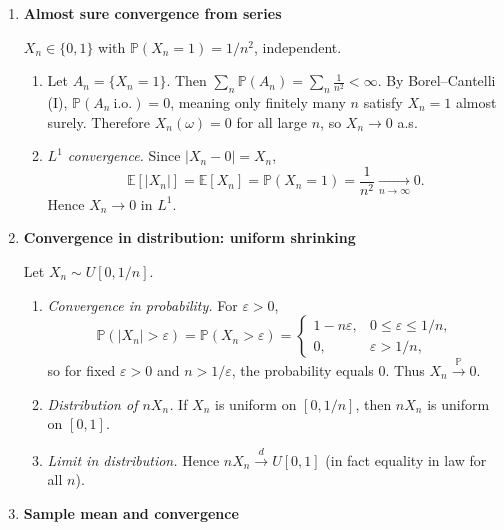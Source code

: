 \documentclass[11pt]{article}
\begin{document}
\begin{enumerate}
\bigskip

\item \textbf{Almost sure convergence from series}

$X_n\in\{0,1\}$ with $\mathbb{P}(X_n=1)=1/n^2$, independent.

\begin{enumerate}
\item Let $A_n=\{X_n=1\}$. Then $\sum_n \mathbb{P}(A_n)=\sum_n \frac1{n^2}<\infty$.
By Borel--Cantelli (I), $\mathbb{P}(A_n\ \text{i.o.})=0$, meaning only finitely many $n$ satisfy $X_n=1$ almost surely.
Therefore $X_n(\omega)=0$ for all large $n$, so $X_n\to 0$ a.s.

\item \emph{$L^1$ convergence.}
Since $|X_n-0|=X_n$,
\[
\mathbb{E}[|X_n|]=\mathbb{E}[X_n]=\mathbb{P}(X_n=1)=\frac1{n^2}\xrightarrow[n\to\infty]{}0.
\]
Hence $X_n\to 0$ in $L^1$.
\end{enumerate}

\bigskip

\item \textbf{Convergence in distribution: uniform shrinking}

Let $X_n\sim U[0,1/n]$.

\begin{enumerate}
\item \emph{Convergence in probability.}
For $\varepsilon>0$,
\[
\mathbb{P}(|X_n|>\varepsilon)=\mathbb{P}(X_n>\varepsilon)=
\begin{cases}
1-n\varepsilon, & 0\le \varepsilon\le 1/n,\\
0, & \varepsilon>1/n,
\end{cases}
\]
so for fixed $\varepsilon>0$ and $n>1/\varepsilon$, the probability equals $0$. Thus $X_n\xrightarrow{\mathbb{P}}0$.

\item \emph{Distribution of $nX_n$.}
If $X_n$ is uniform on $[0,1/n]$, then $nX_n$ is uniform on $[0,1]$.

\item \emph{Limit in distribution.}
Hence $nX_n \xrightarrow{d} U[0,1]$ (in fact equality in law for all $n$).
\end{enumerate}

\bigskip

\item \textbf{Sample mean and convergence}


\end{enumerate}
\end{document}
